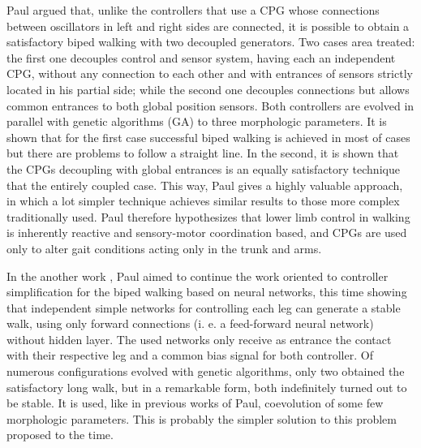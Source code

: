 Paul \cite{Paul03Bilateral} argued that, unlike the controllers that
use a CPG whose connections between oscillators in left and right
sides are connected, it is possible to obtain a satisfactory biped
walking with two decoupled generators. Two cases area treated: the
first one decouples control and sensor system, having each an
independent CPG, without any connection to each other and with
entrances of sensors strictly located in his partial side; while the
second one decouples connections but allows common entrances to both
global position sensors. Both controllers are evolved in parallel with
genetic algorithms (GA) to three morphologic parameters. It is shown
that for the first case successful biped walking is achieved in most
of cases but there are problems to follow a straight line. In the
second, it is shown that the CPGs decoupling with global entrances is
an equally satisfactory technique that the entirely coupled case. This
way, Paul gives a highly valuable approach, in which a lot simpler
technique achieves similar results to those more complex traditionally
used. Paul therefore hypothesizes that lower limb control in walking
is inherently reactive and sensory-motor coordination based, and CPGs
are used only to alter gait conditions acting only in the trunk and
arms.


In the another work \cite{Paul04Sensorimotor}, Paul aimed to continue
the work oriented to controller simplification for the biped walking
based on neural networks, this time showing that independent simple
networks for controlling each leg can generate a stable walk, using
only forward connections (i. e. a feed-forward neural network) without
hidden layer. The used networks only receive as entrance the contact
with their respective leg and a common bias signal for both
controller. Of numerous configurations evolved with genetic
algorithms, only two obtained the satisfactory long walk, but in a
remarkable form, both indefinitely turned out to be stable. It is
used, like in previous works of Paul, coevolution of some few
morphologic parameters. This is probably the simpler solution to this
problem proposed to the time.


